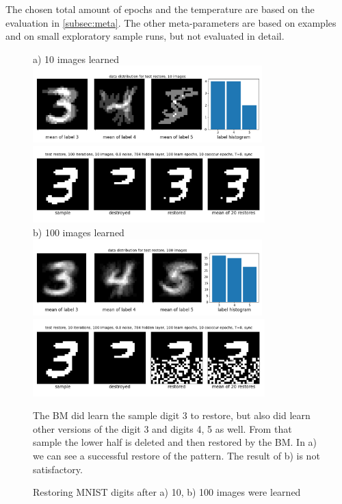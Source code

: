 \documentclass[12pt,twoside]{article}
\theoremstyle{plain}
\theoremstyle{definition}
\theoremstyle{remark}
\begin{document}
The chosen total amount of epochs and the temperature are based on the evaluation in \cref{subsec:meta}. The other meta-parameters are based on examples~\cite{BMImpl} and on small exploratory sample runs, but not evaluated in detail.

\begin{figure}[t!]
	\begin{center}
	a) 10 images learned
	\includegraphics[trim={0.2cm 0.5cm 0cm 1.7cm},clip,width=0.79\textwidth]{src/data_distribution_10_images}
	\includegraphics[trim={0cm 1.0cm 0cm 0cm},clip,width=0.8\textwidth]{src/test_restore_10_images}\\
	b) 100 images learned
	\includegraphics[trim={0.2cm 0.5cm 0cm 1.7cm},clip,width=0.79\textwidth]{src/data_distribution_100_images}
	\includegraphics[trim={0cm 1.0cm 0cm 0cm},clip,width=0.8\textwidth]{src/test_restore_100_images}
	\end{center}
	\caption{Restoring MNIST digits after a) 10, b) 100 images were learned}\label{fig:test_restore}
	\footnotesize The BM did learn the sample digit 3 to restore, but also did learn other versions of the digit 3 and digits 4, 5 as well. From that sample the lower half is deleted and then restored by the BM. In a) we can see a successful restore of the pattern. The result of b) is not satisfactory.
\end{figure}
\end{document}
